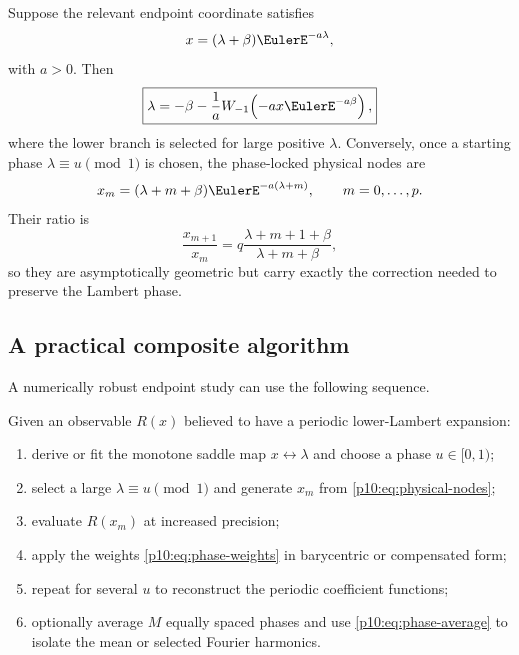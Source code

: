 \documentclass[11pt]{article}
\numberwithin{equation}{section}
\theoremstyle{definition}
\theoremstyle{remark}
\begin{document}
Suppose the relevant endpoint coordinate satisfies
\begin{equation}
 x=(\lambda+\beta)\EulerE^{-a\lambda},                            \label{p10:eq:lambert-node-equation}
\end{equation}
with $a>0$.  Then
\begin{equation}
 \boxed{\displaystyle
 \lambda=-\beta-\frac1a
 W_{-1}\!\left(-ax\EulerE^{-a\beta}\right),}                    \label{p10:eq:lambert-node-inverse}
\end{equation}
where the lower branch is selected for large positive $\lambda$.  Conversely, once a starting
phase $\lambda\equiv u\pmod1$ is chosen, the phase-locked physical nodes are
\begin{equation}
 x_m=(\lambda+m+\beta)\EulerE^{-a(\lambda+m)},
 \qquad m=0,\ldots,p.                                       \label{p10:eq:physical-nodes}
\end{equation}
Their ratio is
\begin{equation}
 \frac{x_{m+1}}{x_m}
 =q\frac{\lambda+m+1+\beta}{\lambda+m+\beta},               \label{p10:eq:node-ratio}
\end{equation}
so they are asymptotically geometric but carry exactly the correction needed to preserve the
Lambert phase.

\subsection{A practical composite algorithm}

A numerically robust endpoint study can use the following sequence.

\begin{algorithm}
\label{p10:alg:phase}
Given an observable $R(x)$ believed to have a periodic lower-Lambert expansion:
\begin{enumerate}
\item derive or fit the monotone saddle map $x\leftrightarrow\lambda$ and choose a phase
      $u\in[0,1)$;
\item select a large $\lambda\equiv u\pmod1$ and generate $x_m$ from
      \eqref{p10:eq:physical-nodes};
\item evaluate $R(x_m)$ at increased precision;
\item apply the weights \eqref{p10:eq:phase-weights} in barycentric or compensated form;
\item repeat for several $u$ to reconstruct the periodic coefficient functions;
\item optionally average $M$ equally spaced phases and use \eqref{p10:eq:phase-average} to isolate
      the mean or selected Fourier harmonics.
\end{enumerate}
\end{algorithm}
\end{document}
